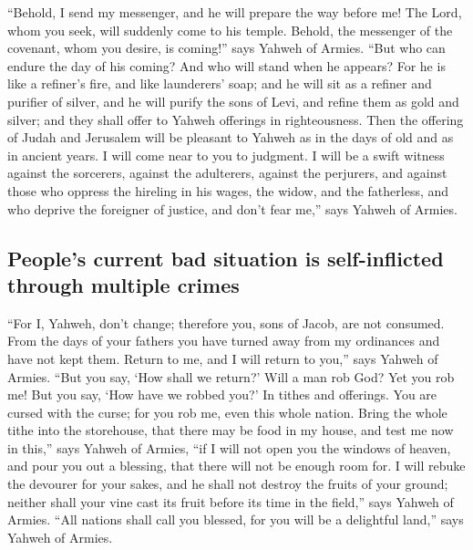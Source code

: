  ``Behold, I send my messenger, and he will prepare the
way before me! The Lord, whom you seek, will suddenly come to his
temple. Behold, the messenger of the covenant, whom you desire, is
coming!'' says Yahweh of Armies.  ``But who can endure the
day of his coming? And who will stand when he appears? For he is like a
refiner's fire, and like launderers' soap;  and he will
sit as a refiner and purifier of silver, and he will purify the sons of
Levi, and refine them as gold and silver; and they shall offer to Yahweh
offerings in righteousness.  Then the offering of Judah
and Jerusalem will be pleasant to Yahweh as in the days of old and as in
ancient years.  I will come near to you to judgment. I
will be a swift witness against the sorcerers, against the adulterers,
against the perjurers, and against those who oppress the hireling in his
wages, the widow, and the fatherless, and who deprive the foreigner of
justice, and don't fear me,'' says Yahweh of Armies.

\hypertarget{peoples-current-bad-situation-is-self-inflicted-through-multiple-crimes}{%
\subsection{People's current bad situation is self-inflicted through
multiple
crimes}\label{peoples-current-bad-situation-is-self-inflicted-through-multiple-crimes}}

 ``For I, Yahweh, don't change; therefore you, sons of
Jacob, are not consumed.  From the days of your fathers
you have turned away from my ordinances and have not kept them. Return
to me, and I will return to you,'' says Yahweh of Armies. ``But you say,
`How shall we return?'  Will a man rob God? Yet you rob
me! But you say, `How have we robbed you?' In tithes and offerings.
 You are cursed with the curse; for you rob me, even this
whole nation.  Bring the whole tithe into the storehouse,
that there may be food in my house, and test me now in this,'' says
Yahweh of Armies, ``if I will not open you the windows of heaven, and
pour you out a blessing, that there will not be enough room for.
 I will rebuke the devourer for your sakes, and he shall
not destroy the fruits of your ground; neither shall your vine cast its
fruit before its time in the field,'' says Yahweh of Armies.
 ``All nations shall call you blessed, for you will be a
delightful land,'' says Yahweh of Armies.


